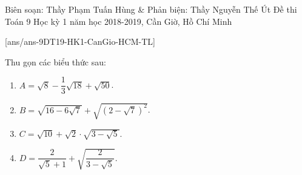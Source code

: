 
\begin{name}
{Biên soạn: Thầy Phạm Tuấn Hùng \& Phản biện: Thầy Nguyễn Thế Út}
{Đề thi Toán 9 Học kỳ 1 năm học 2018-2019, Cần Giờ, Hồ Chí Minh }
\end{name}
\setcounter{bt}{0}
[ans/ans-9DT19-HK1-CanGio-HCM-TL]
\begin{bt}%
	Thu gọn các biểu thức sau:
	\begin{enumerate}
		\item $A=\sqrt{8}-\dfrac{1}{3}\sqrt{18}+\sqrt{50}$.
		\item $B=\sqrt{16-6\sqrt{7}}+\sqrt{(2-\sqrt{7})^2}$.
		\item $C=\sqrt{10}+\sqrt{2}\cdot \sqrt{3-\sqrt{5}}$.
		\item $D=\dfrac{2}{\sqrt{5}+1}+\sqrt{\dfrac{2}{3-\sqrt{5}}}$.
	\end{enumerate}

\end{bt}

